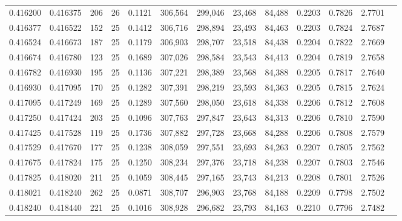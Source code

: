 \begin{tabular}{rrrrrrrrrrrrr}
0.416200 & 0.416375 &   206 &  26 &                                     0.1121 & 306,564 & 299,046 &  23,468 &  84,488 & 0.2203 & 0.7826 & 2.7701 \\
0.416377 & 0.416522 &   152 &  25 &                                     0.1412 & 306,716 & 298,894 &  23,493 &  84,463 & 0.2203 & 0.7824 & 2.7687 \\
0.416524 & 0.416673 &   187 &  25 &                                     0.1179 & 306,903 & 298,707 &  23,518 &  84,438 & 0.2204 & 0.7822 & 2.7669 \\
0.416674 & 0.416780 &   123 &  25 &                                     0.1689 & 307,026 & 298,584 &  23,543 &  84,413 & 0.2204 & 0.7819 & 2.7658 \\
0.416782 & 0.416930 &   195 &  25 &                                     0.1136 & 307,221 & 298,389 &  23,568 &  84,388 & 0.2205 & 0.7817 & 2.7640 \\
0.416930 & 0.417095 &   170 &  25 &                                     0.1282 & 307,391 & 298,219 &  23,593 &  84,363 & 0.2205 & 0.7815 & 2.7624 \\
0.417095 & 0.417249 &   169 &  25 &                                     0.1289 & 307,560 & 298,050 &  23,618 &  84,338 & 0.2206 & 0.7812 & 2.7608 \\
0.417250 & 0.417424 &   203 &  25 &                                     0.1096 & 307,763 & 297,847 &  23,643 &  84,313 & 0.2206 & 0.7810 & 2.7590 \\
0.417425 & 0.417528 &   119 &  25 &                                     0.1736 & 307,882 & 297,728 &  23,668 &  84,288 & 0.2206 & 0.7808 & 2.7579 \\
0.417529 & 0.417670 &   177 &  25 &                                     0.1238 & 308,059 & 297,551 &  23,693 &  84,263 & 0.2207 & 0.7805 & 2.7562 \\
0.417675 & 0.417824 &   175 &  25 &                                     0.1250 & 308,234 & 297,376 &  23,718 &  84,238 & 0.2207 & 0.7803 & 2.7546 \\
0.417825 & 0.418020 &   211 &  25 &                                     0.1059 & 308,445 & 297,165 &  23,743 &  84,213 & 0.2208 & 0.7801 & 2.7526 \\
0.418021 & 0.418240 &   262 &  25 &                                     0.0871 & 308,707 & 296,903 &  23,768 &  84,188 & 0.2209 & 0.7798 & 2.7502 \\
0.418240 & 0.418440 &   221 &  25 &                                     0.1016 & 308,928 & 296,682 &  23,793 &  84,163 & 0.2210 & 0.7796 & 2.7482 \\

\end{tabular}
